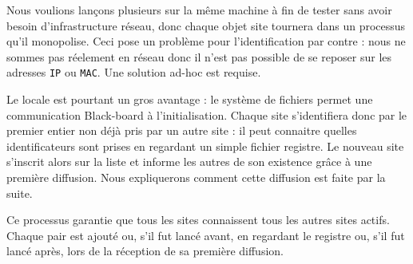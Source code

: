Nous voulions lançons plusieurs sur la même machine à fin de tester sans avoir besoin d'infrastructure réseau, donc chaque objet site tournera dans un processus qu'il monopolise. Ceci pose un problème pour l'identification par contre : nous ne sommes pas réelement en réseau donc il n'est pas possible de se reposer sur les adresses \texttt{IP} ou \texttt{MAC}. Une solution ad-hoc est requise.

Le locale est pourtant un gros avantage : le système de fichiers permet une communication \og Black-board \fg{} à l'initialisation. Chaque site s'identifiera donc par le premier entier non déjà pris par un autre site : il peut connaitre quelles identificateurs sont prises en regardant un simple fichier registre. Le nouveau site s'inscrit alors sur la liste et informe les autres de son existence grâce à une première diffusion. Nous expliquerons comment cette diffusion est faite par la suite.

Ce processus garantie que tous les sites connaissent tous les autres sites actifs. Chaque pair est ajouté ou, s'il fut lancé avant, en regardant le registre ou, s'il fut lancé après, lors de la réception de sa première diffusion. 


